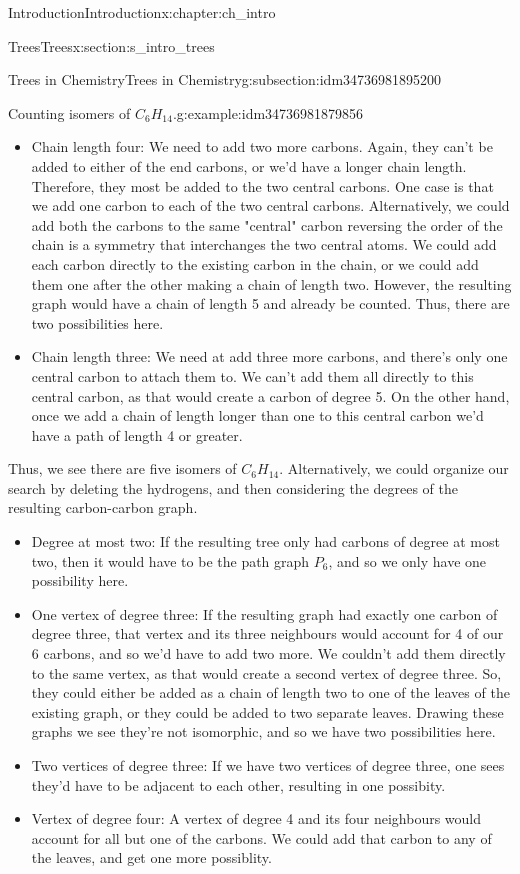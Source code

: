 \documentclass[oneside,10pt,]{book}
\numberwithin{equation}{section}
\begin{document}
\begin{chapterptx}{Introduction}{}{Introduction}{}{}{x:chapter:ch_intro}
\begin{sectionptx}{Trees}{}{Trees}{}{}{x:section:s_intro_trees}
\begin{subsectionptx}{Trees in Chemistry}{}{Trees in Chemistry}{}{}{g:subsection:idm34736981895200}
\begin{example}{Counting isomers of \(C_6H_{14}\).}{g:example:idm34736981879856}
\begin{itemize}[label=\textbullet]
\item{}Chain length four: We need to add two more carbons.  Again, they can't be added to either of the end carbons, or we'd have a longer chain length.  Therefore, they most be added to the two central carbons.  One case is that we add one carbon to each of the two central carbons.  Alternatively, we could add both the carbons to the same "central" carbon reversing the order of the chain is a symmetry that interchanges the two central atoms.  We could add each carbon directly to the existing carbon in the chain, or we could add them one after the other making a chain of length two.  However, the resulting graph would have a chain of length 5 and already be counted.   Thus, there are two possibilities here.%
\item{}Chain length three: We need at add three more carbons, and there's only one central carbon to attach them to.  We can't add them all directly to this central carbon, as that would create a carbon of degree 5.  On the other hand, once we add a chain of length longer than one to this central carbon we'd have a path of length 4 or greater.%
\end{itemize}
Thus, we see there are five isomers of \(C_6H_{14}\).  Alternatively, we could organize our search by deleting the hydrogens, and then considering the degrees of the resulting carbon-carbon graph.%
%
\begin{itemize}[label=\textbullet]
\item{}Degree at most two: If the resulting tree only had carbons of degree at most two, then it would have to be the path graph \(P_6\), and so we only have one possibility here.%
\item{}One vertex of degree three: If the resulting graph had exactly one carbon of degree three, that vertex and its three neighbours would account for 4 of our 6 carbons, and so we'd have to add two more.  We couldn't add them directly to the same vertex, as that would create a second vertex of degree three.  So, they could either be added as a chain of length two to one of the leaves of the existing graph, or they could be added to two separate leaves.  Drawing these graphs we see they're not isomorphic, and so we have two possibilities here.%
\item{}Two vertices of degree three: If we have two vertices of degree three, one sees they'd have to be adjacent to each other, resulting in one possibity.%
\item{}Vertex of degree four: A vertex of degree 4 and its four neighbours would account for all but one of the carbons.  We could add that carbon to any of the leaves, and get one more possiblity.%

\end{itemize}
\end{example}
\end{subsectionptx}
\end{sectionptx}
\end{chapterptx}
\end{document}
